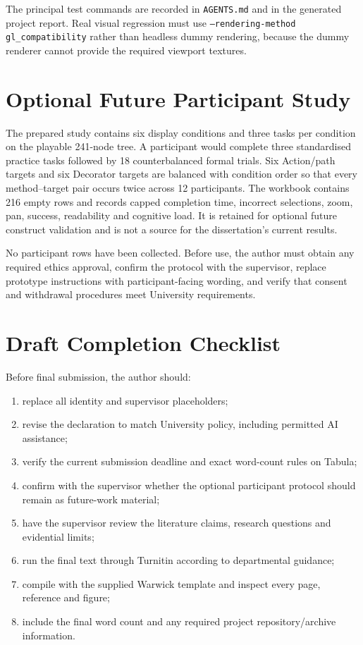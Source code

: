 The principal test commands are recorded in \texttt{AGENTS.md} and in the generated project report. Real visual regression must use \texttt{--rendering-method gl\_compatibility} rather than headless dummy rendering, because the dummy renderer cannot provide the required viewport textures.

\chapter{Optional Future Participant Study}
\label{app:study}

The prepared study contains six display conditions and three tasks per condition on the playable 241-node tree. A participant would complete three standardised practice tasks followed by 18 counterbalanced formal trials. Six Action/path targets and six Decorator targets are balanced with condition order so that every method--target pair occurs twice across 12 participants. The workbook contains 216 empty rows and records capped completion time, incorrect selections, zoom, pan, success, readability and cognitive load. It is retained for optional future construct validation and is not a source for the dissertation's current results.

No participant rows have been collected. Before use, the author must obtain any required ethics approval, confirm the protocol with the supervisor, replace prototype instructions with participant-facing wording, and verify that consent and withdrawal procedures meet University requirements.

\chapter{Draft Completion Checklist}
\label{app:checklist}

Before final submission, the author should:
\begin{enumerate}
    \item replace all identity and supervisor placeholders;
    \item revise the declaration to match University policy, including permitted AI assistance;
    \item verify the current submission deadline and exact word-count rules on Tabula;
    \item confirm with the supervisor whether the optional participant protocol should remain as future-work material;
    \item have the supervisor review the literature claims, research questions and evidential limits;
    \item run the final text through Turnitin according to departmental guidance;
    \item compile with the supplied Warwick template and inspect every page, reference and figure;
    \item include the final word count and any required project repository/archive information.
\end{enumerate}
